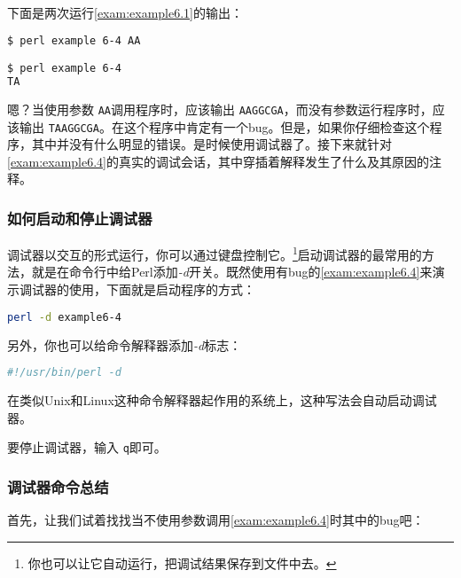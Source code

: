 

下面是两次运行\autoref{exam:example6.1}的输出：

\begin{lstlisting}[language=bash]
$ perl example 6-4 AA

$ perl example 6-4
TA
\end{lstlisting}

嗯？当使用参数 \verb|AA|调用程序时，应该输出 \verb|AAGGCGA|，而没有参数运行程序时，应该输出 \verb|TAAGGCGA|。在这个程序中肯定有一个bug。但是，如果你仔细检查这个程序，其中并没有什么明显的错误。是时候使用调试器了。接下来就针对\autoref{exam:example6.4}的真实的调试会话，其中穿插着解释发生了什么及其原因的注释。

\subsubsection{如何启动和停止调试器}
调试器以交互的形式运行，你可以通过键盘控制它。\footnote{你也可以让它自动运行，把调试结果保存到文件中去。}启动调试器的最常用的方法，就是在命令行中给Perl添加\textit{-d}开关。既然使用有bug的\autoref{exam:example6.4}来演示调试器的使用，下面就是启动程序的方式：

\begin{lstlisting}[language=bash]
perl -d example6-4
\end{lstlisting}

另外，你也可以给命令解释器添加\textit{-d}标志：

\begin{lstlisting}[language=bash]
#!/usr/bin/perl -d
\end{lstlisting}

在类似Unix和Linux这种命令解释器起作用的系统上，这种写法会自动启动调试器。

要停止调试器，输入 \verb|q|即可。

\subsubsection{调试器命令总结}
首先，让我们试着找找当不使用参数调用\autoref{exam:example6.4}时其中的bug吧：



